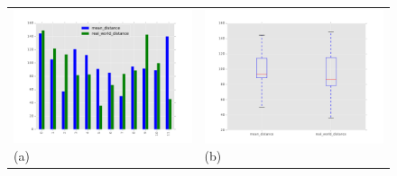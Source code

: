     
		    
\begin{figure}[h]
	\centering
	\begin{tabular}{m{7.0cm} m{7.0cm}}
	\includegraphics[width=7cm]{img/evaluation/big_bar}
	\centering \small (a)
	&
	\includegraphics[width=7cm]{img/evaluation/big_box}
	\centering \small (b)
	\end{tabular}
    \caption{}
    \label{fig:eval_big}
\end{figure}


